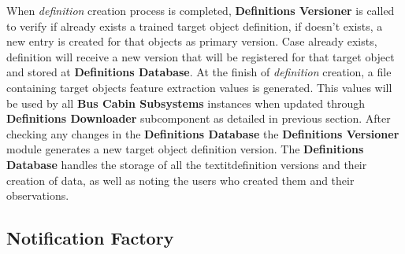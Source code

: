 When \textit{definition} creation process is completed, \textbf{Definitions Versioner} is called to verify if already exists a trained target object definition, if doesn't exists, a new entry is created for that objects as primary version. Case already exists, definition will receive a new version that will be registered for that target object and stored at \textbf{Definitions Database}. 
At the finish of \textit{definition} creation, a file containing target objects feature extraction values is generated. This values will be used by all \textbf{Bus Cabin Subsystems} instances when updated through \textbf{Definitions Downloader} subcomponent as detailed in previous section. After checking any changes in the \textbf{Definitions Database} the \textbf{Definitions Versioner} module generates a new target object definition version. The \textbf{Definitions Database} handles the storage of all the textit{definition} versions and their creation of data, as well as noting the users who created them and their observations.

%
%
%
%

%
%



\subsection{Notification Factory}

